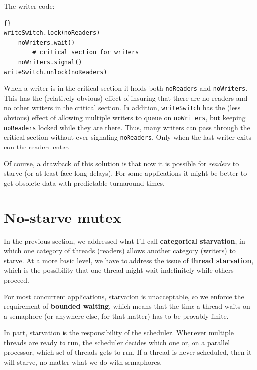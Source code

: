 \documentclass{book}
\newcommand{\clearemptydoublepage}{\newpage\cleardoublepage}
\begin{document}
The writer code:

\begin{latin}
\begin{latin}
\begin{lstlisting}[title={Writer-priority writer solution}]{}
writeSwitch.lock(noReaders)
    noWriters.wait()
        # critical section for writers
    noWriters.signal()
writeSwitch.unlock(noReaders)
\end{lstlisting}
\end{latin}
\end{latin}

When a writer is in the critical section it holds both
{\tt noReaders} and {\tt noWriters}.  This has the
(relatively obvious) effect of insuring that there are
no readers and no other writers in the critical section.
In addition, {\tt writeSwitch} has the (less obvious) effect of
allowing multiple writers to queue on {\tt noWriters},
but keeping {\tt noReaders} locked while they are
there.  Thus, many writers can pass through the critical
section without ever signaling
{\tt noReaders}.  Only when the last writer exits can
the readers enter.

Of course, a drawback of this solution is that now it is
possible for {\em readers} to starve (or at least face long
delays).  For some applications it might be better to get
obsolete data with predictable turnaround times.



\clearemptydoublepage
\section{No-starve mutex}
\label{props}

In the previous section, we addressed what I'll call
{\bf categorical starvation}, in which one category of threads
(readers) allows another category (writers) to starve.
At a more basic level, we have to address the issue of
{\bf thread starvation}, which is the possibility that one
thread might wait indefinitely while others proceed.

For most concurrent applications, starvation is unacceptable,
so we enforce the requirement of {\bf bounded waiting}, which
means that the time a thread waits on a semaphore (or anywhere
else, for that matter) has to be provably finite.

In part, starvation is the responsibility of the scheduler.
Whenever multiple threads are ready to run, the scheduler decides
which one or, on a parallel processor, which set of threads gets
to run.  If a thread is never scheduled, then it will starve,
no matter what we do with semaphores.
\end{document}
